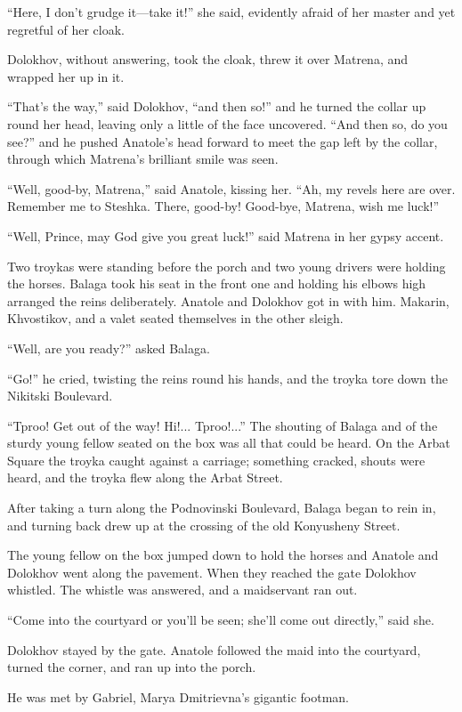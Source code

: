 ``Here, I don't grudge it---take it!'' she said, evidently afraid
of her master and yet regretful of her cloak.

Dolokhov, without answering, took the cloak, threw it over
Matrena, and wrapped her up in it.

``That's the way,'' said Dolokhov, ``and then so!'' and he turned
the collar up round her head, leaving only a little of the face
uncovered. ``And then so, do you see?'' and he pushed Anatole's
head forward to meet the gap left by the collar, through which
Matrena's brilliant smile was seen.

``Well, good-by, Matrena,'' said Anatole, kissing her. ``Ah, my
revels here are over. Remember me to Steshka. There, good-by!
Good-bye, Matrena, wish me luck!''

``Well, Prince, may God give you great luck!'' said Matrena in
her gypsy accent.

Two troykas were standing before the porch and two young drivers
were holding the horses. Balaga took his seat in the front one
and holding his elbows high arranged the reins
deliberately. Anatole and Dolokhov got in with him. Makarin,
Khvostikov, and a valet seated themselves in the other sleigh.

``Well, are you ready?'' asked Balaga.

``Go!'' he cried, twisting the reins round his hands, and the
troyka tore down the Nikitski Boulevard.

``Tproo! Get out of the way! Hi!... Tproo!...'' The shouting of
Balaga and of the sturdy young fellow seated on the box was all
that could be heard. On the Arbat Square the troyka caught
against a carriage; something cracked, shouts were heard, and the
troyka flew along the Arbat Street.

After taking a turn along the Podnovinski Boulevard, Balaga began
to rein in, and turning back drew up at the crossing of the old
Konyusheny Street.

The young fellow on the box jumped down to hold the horses and
Anatole and Dolokhov went along the pavement. When they reached
the gate Dolokhov whistled. The whistle was answered, and a
maidservant ran out.

``Come into the courtyard or you'll be seen; she'll come out
directly,'' said she.

Dolokhov stayed by the gate. Anatole followed the maid into the
courtyard, turned the corner, and ran up into the porch.

He was met by Gabriel, Marya Dmitrievna's gigantic footman.

